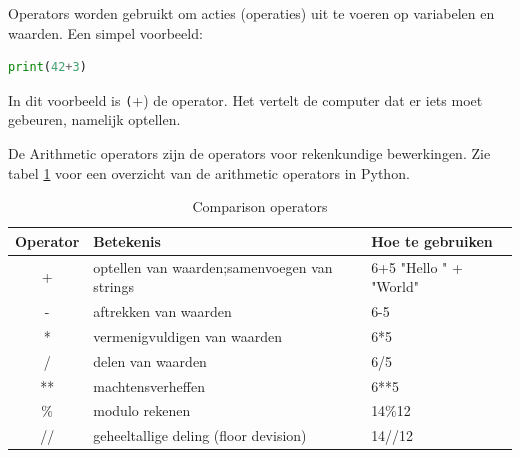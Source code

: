 Operators worden gebruikt om acties (operaties) uit te voeren op variabelen en waarden. Een simpel voorbeeld:
\begin{lstlisting}[language=python]
print(42+3)
\end{lstlisting}
In dit voorbeeld is \texttt(+) de operator. Het vertelt de computer dat er iets moet gebeuren, namelijk optellen.

De Arithmetic operators zijn de operators voor rekenkundige bewerkingen. Zie tabel \ref{table:compop} voor een overzicht van de arithmetic operators in Python.
\begin{flushleft}
\begin{table}[h!]
\centering
	\begin{tabularx}{\textwidth}{ |c|X|X| }
\hline
	Operator &
	Betekenis &
	Hoe te gebruiken \\
\hline
	+\index{operator!+} &
	optellen\index{optellen} van waarden;\newline samenvoegen van strings &
		6+5 \newline
	"Hello " + "World" \\
\hline
	-\index{operator!-} &
	aftrekken\index{aftrekken} van waarden &
	6-5 	\\
\hline
	*\index{operator!*} &
	vermenigvuldigen\index{vermenigvuldigen} van waarden &
	6*5 \\
\hline
	/\index{operator!/} &
	delen\index{delen} van waarden &
	6/5 \\
\hline
	**\index{operator!**} &
	machtensverheffen\index{machtsverheffen} &
	6**5 \\
\hline
	\%\index{operator!\%} &
	modulo rekenen\index{modulo rekenen} &
	14\%12 \\
\hline
	//\index{operator!//} &
		geheeltallige deling\index{geheeltallige deling} (floor devision\index{floor devision}) &
	14//12 \\
\hline
\end{tabularx}
\caption{Comparison operators}
\label{table:compop}
\end{table}
\end{flushleft}

